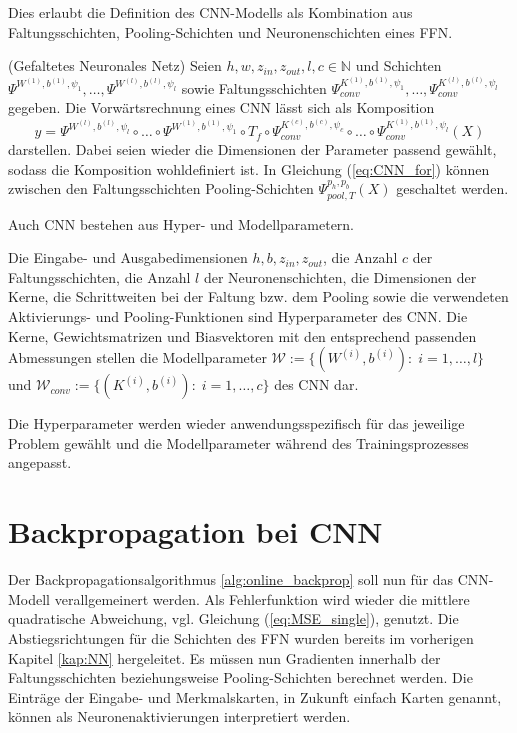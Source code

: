 Dies erlaubt die Definition des CNN-Modells als Kombination aus Faltungsschichten, Pooling-Schichten und Neuronenschichten eines FFN.
\begin{defi}(Gefaltetes Neuronales Netz)
    \label{def_fw_cnn}
    Seien $h, w, z_{in}, z_{out}, l ,c \in \mathbb{N}$ und Schichten $\Psi^{W^{(1)},b^{(1)},\psi_{1}}, \ldots, \Psi^{W^{(l)},b^{(l)},\psi_{l}}$ sowie Faltungsschichten $\Psi_{conv}^{K^{(1)},b^{(1)},\psi_{1}}, \ldots, \Psi_{conv}^{K^{(l)},b^{(l)},\psi_{l}}$ gegeben. Die Vorwärtsrechnung eines CNN lässt sich als Komposition
    \begin{equation}
        \label{eq:CNN_for}
        y=\Psi^{W^{(l)},b^{(l)},\psi_{l}} \circ \ldots \circ \Psi^{W^{(1)},b^{(1)},\psi_{1}} \circ T_f \circ \Psi_{conv}^{K^{(c)},b^{(c)},\psi_{c}} \circ \ldots \circ \Psi_{conv}^{K^{(1)},b^{(1)},\psi_{l}}(X)
    \end{equation} 
    darstellen. Dabei seien wieder die Dimensionen der Parameter passend gewählt, sodass die Komposition wohldefiniert ist. In Gleichung (\ref{eq:CNN_for}) können zwischen den Faltungsschichten Pooling-Schichten $\Psi_{pool,T}^{p_h,p_b}(X)$ geschaltet werden.
\end{defi}
Auch CNN bestehen aus Hyper- und Modellparametern.

\begin{defi}
    Die Eingabe- und Ausgabedimensionen $h, b, z_{in}, z_{out}$, die Anzahl $c$ der Faltungsschichten, die Anzahl $l$ der Neuronenschichten, die Dimensionen der Kerne, die Schrittweiten bei der Faltung bzw. dem Pooling sowie die verwendeten Aktivierungs- und Pooling-Funktionen sind Hyperparameter des CNN.
    Die Kerne, Gewichtsmatrizen und Biasvektoren mit den entsprechend passenden Abmessungen stellen die Modellparameter $\mathcal{W}:=\{(W^{(i)},b^{(i)}): \; i=1, \ldots, l\}$ und $\mathcal{W}_{conv}:=\{(K^{(i)}, b^{(i)}): \; i=1, \ldots, c\}$ des CNN dar. 
\end{defi}
Die Hyperparameter werden wieder anwendungsspezifisch für das jeweilige Problem gewählt und die Modellparameter während des Trainingsprozesses angepasst. 

\section{Backpropagation bei CNN}
\label{abs:CNN_train}
Der Backpropagationsalgorithmus \ref{alg:online_backprop} soll nun für das CNN-Modell verallgemeinert werden. 
Als Fehlerfunktion wird wieder die mittlere quadratische Abweichung, vgl. Gleichung (\ref{eq:MSE_single}), genutzt. 
Die Abstiegsrichtungen für die Schichten des FFN wurden bereits im vorherigen Kapitel \ref{kap:NN} hergeleitet. Es müssen nun Gradienten innerhalb der Faltungsschichten beziehungsweise Pooling-Schichten berechnet werden. Die Einträge der Eingabe- und Merkmalskarten, in Zukunft einfach Karten genannt, können als Neuronenaktivierungen interpretiert werden. 

